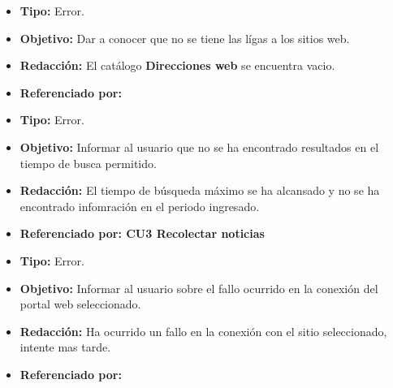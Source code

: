   
    \begin{itemize}
      \item \textbf{Tipo:} Error. 
      \item \textbf{Objetivo:}  Dar a conocer que no se tiene las lígas a los sitios web.
      \item \textbf{Redacción:} El catálogo \textbf{Direcciones web} se encuentra vacio.
      \item \textbf{Referenciado por:} \\
    \end{itemize}


  \begin{itemize}
    \item \textbf{Tipo:} Error. 
    \item \textbf{Objetivo:}  Informar al usuario que no se ha encontrado resultados en el tiempo de busca permitido.
    \item \textbf{Redacción:}  El tiempo de búsqueda máximo se ha alcansado y no se ha encontrado infomración en el periodo ingresado.
    \item \textbf{Referenciado por: CU3 Recolectar noticias}\\
  \end{itemize}

  \begin{itemize}
    \item \textbf{Tipo:} Error. 
    \item \textbf{Objetivo:} Informar al usuario sobre el fallo ocurrido en la conexión del portal web seleccionado.
    \item \textbf{Redacción:} Ha ocurrido un fallo en la conexión con el sitio seleccionado, intente mas tarde.
    \item \textbf{Referenciado por:} \\
  \end{itemize}



